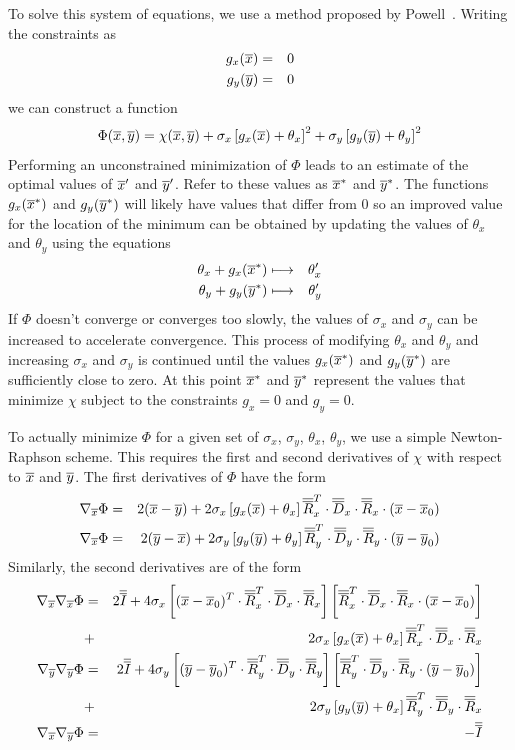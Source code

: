 \documentclass[12pt]{article}
\begin{document}
To solve this system of equations, we use a method proposed by Powell~\cite{Powell}. Writing the constraints as
\begin{eqnarray*}
g_x(\overline{x}) &=& 0\\
g_y(\overline{y}) &=& 0
\end{eqnarray*}
we can construct a function
\[
\Phi(\overline{x},\overline{y}) = \chi(\overline{x},\overline{y}) + \sigma_x\left[g_x(\overline{x})+\theta_x\right]^2
+\sigma_y\left[g_y(\overline{y})+\theta_y\right]^2
\]
Performing an unconstrained minimization of $\Phi$ leads to an estimate of the optimal values of $\overline{x}'$ and
$\overline{y}'$. Refer to these values as $\overline{x}^{\ast}$ and $\overline{y}^{\ast}$. The functions $g_x(\overline{x}^{\ast})$ and
$g_y(\overline{y}^{\ast})$ will likely have values that differ from 0 so an improved value for the location of the
minimum can be obtained by updating the values of $\theta_x$ and $\theta_y$ using the equations
\begin{eqnarray*}
\theta_x + g_x(\overline{x}^{\ast}) &\longmapsto& \theta'_x \\
\theta_y + g_y(\overline{y}^{\ast}) &\longmapsto& \theta'_y
\end{eqnarray*}
If $\Phi$ doesn't converge or converges too slowly, the values of $\sigma_x$ and $\sigma_y$ can be increased
to accelerate convergence. This process of modifying $\theta_x$ and $\theta_y$ and increasing $\sigma_x$ and
$\sigma_y$ is continued until the values $g_x(\overline{x}^{\ast})$ and $g_y(\overline{y}^{\ast})$ are sufficiently close
to zero. At this point $\overline{x}^{\ast}$ and $\overline{y}^{\ast}$ represent the values that minimize $\chi$ subject
to the constraints $g_x=0$ and $g_y=0$.

To actually minimize $\Phi$ for a given set of $\sigma_x$, $\sigma_y$, $\theta_x$, $\theta_y$, we use a
simple Newton-Raphson scheme. This requires the first and second derivatives of $\chi$ with respect to
$\overline{x}$ and $\overline{y}$. The first derivatives of $\Phi$ have the form
\begin{eqnarray*}
\nabla_{\overline{x}}\Phi &=& 2(\overline{x}-\overline{y}) + 2\sigma_x\left[g_x(\overline{x})+\theta_x\right]\overline{\overline{R}}_x^T\cdot\overline{\overline{D}}_x
\cdot\overline{\overline{R}}_x\cdot(\overline{x}-\overline{x}_0) \\
\nabla_{\overline{x}}\Phi &=& 2(\overline{y}-\overline{x}) + 2\sigma_y\left[g_y(\overline{y})+\theta_y\right]\overline{\overline{R}}_y^T\cdot\overline{\overline{D}}_y
\cdot\overline{\overline{R}}_y\cdot(\overline{y}-\overline{y}_0)
\end{eqnarray*}
Similarly, the second derivatives are of the form
\begin{eqnarray*}
\nabla_{\overline{x}}\nabla_{\overline{x}} \Phi & = & 2\overline{\overline{I}}+4\sigma_x\left[(\overline{x}-\overline{x}_0)^T\cdot\overline{\overline{R}}_x^T\cdot\overline{\overline{D}}_x
\cdot\overline{\overline{R}}_x\right]\left[\overline{\overline{R}}_x^T\cdot\overline{\overline{D}}_x\cdot\overline{\overline{R}}_x\cdot(\overline{x}-\overline{x}_0)\right] \\
& + & 2\sigma_x\left[g_x(\overline{x})+\theta_x\right]\overline{\overline{R}}_x^T\cdot\overline{\overline{D}}_x\cdot\overline{\overline{R}}_x \\
\nabla_{\overline{y}}\nabla_{\overline{y}} \Phi & = & 2\overline{\overline{I}}+4\sigma_y\left[(\overline{y}-\overline{y}_0)^T\cdot\overline{\overline{R}}_y^T\cdot\overline{\overline{D}}_y
\cdot\overline{\overline{R}}_y\right]\left[\overline{\overline{R}}_y^T\cdot\overline{\overline{D}}_y\cdot\overline{\overline{R}}_y\cdot(\overline{y}-\overline{y}_0)\right] \\
& + & 2\sigma_y\left[g_y(\overline{y})+\theta_x\right]\overline{\overline{R}}_y^T\cdot\overline{\overline{D}}_y\cdot\overline{\overline{R}}_x \\
\nabla_{\overline{x}}\nabla_{\overline{y}} \Phi & = & -\overline{\overline{I}}
\end{eqnarray*}
\end{document}
